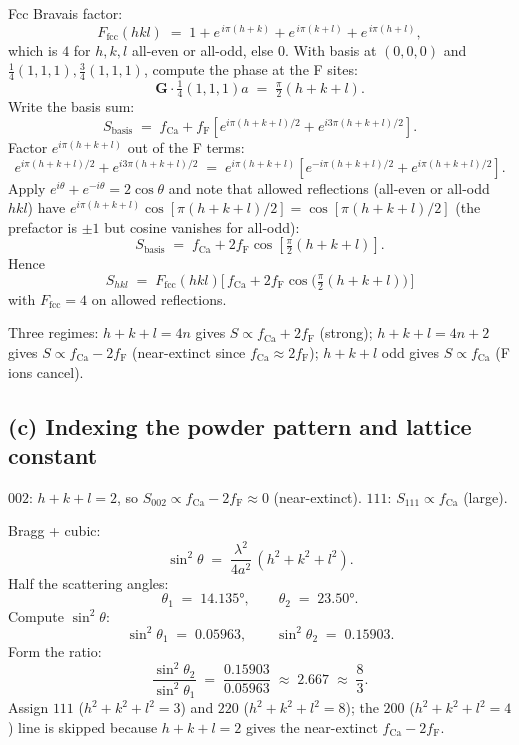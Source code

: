 \documentclass[11pt]{article}
\begin{document}
Fcc Bravais factor:
\begin{equation}
F_{\text{fcc}}(hkl) \;=\; 1 + e^{\,i\pi(h+k)} + e^{\,i\pi(k+l)} + e^{\,i\pi(h+l)},
\label{eq:Ffcc}
\end{equation}
which is $4$ for $h,k,l$ all-even or all-odd, else $0$. With basis at $(0,0,0)$ and $\tfrac14(1,1,1),\tfrac34(1,1,1)$, compute the phase at the F sites:
\[
\mathbf{G}\cdot\tfrac14(1,1,1)a \;=\; \tfrac\pi 2(h+k+l).
\]
Write the basis sum:
\[
S_{\text{basis}} \;=\; f_{\text{Ca}} + f_{\text{F}}\!\left[e^{i\pi(h+k+l)/2}+e^{i3\pi(h+k+l)/2}\right].
\]
Factor $e^{i\pi(h+k+l)}$ out of the F terms:
\[
e^{i\pi(h+k+l)/2}+e^{i3\pi(h+k+l)/2} \;=\; e^{i\pi(h+k+l)}\left[e^{-i\pi(h+k+l)/2}+e^{i\pi(h+k+l)/2}\right].
\]
Apply $e^{i\theta}+e^{-i\theta}=2\cos\theta$ and note that allowed reflections (all-even or all-odd $hkl$) have $e^{i\pi(h+k+l)}\cos[\pi(h+k+l)/2] = \cos[\pi(h+k+l)/2]$ (the prefactor is $\pm1$ but cosine vanishes for all-odd):
\[
S_{\text{basis}} \;=\; f_{\text{Ca}} + 2f_{\text{F}}\cos\!\left[\tfrac\pi 2(h+k+l)\right].
\]
Hence
\begin{equation}
\boxed{\;S_{hkl} \;=\; F_{\text{fcc}}(hkl)\Big[\, f_{\text{Ca}} + 2 f_{\text{F}}\cos\!\big(\tfrac{\pi}{2}(h+k+l)\big)\,\Big]\;}
\label{eq:Scaf2}
\end{equation}
with $F_{\text{fcc}}=4$ on allowed reflections.

Three regimes: $h+k+l=4n$ gives $S\propto f_{\text{Ca}}+2f_{\text{F}}$ (strong); $h+k+l=4n+2$ gives $S\propto f_{\text{Ca}}-2f_{\text{F}}$ (near-extinct since $f_{\text{Ca}}\approx 2f_{\text{F}}$); $h+k+l$ odd gives $S\propto f_{\text{Ca}}$ (F ions cancel).

\subsection*{(c) Indexing the powder pattern and lattice constant}

$002$: $h+k+l=2$, so $S_{002}\propto f_{\text{Ca}}-2f_{\text{F}}\approx 0$ (near-extinct). $111$: $S_{111}\propto f_{\text{Ca}}$ (large).

Bragg + cubic:
\begin{equation}
\sin^2\theta \;=\; \frac{\lambda^2}{4 a^2}\,(h^2+k^2+l^2).
\label{eq:Bragg}
\end{equation}
Half the scattering angles:
\[
\theta_1 \;=\; \ang{14.135},\qquad \theta_2 \;=\; \ang{23.50}.
\]
Compute $\sin^2\theta$:
\[
\sin^2\theta_1 \;=\; 0.05963,\qquad \sin^2\theta_2 \;=\; 0.15903.
\]
Form the ratio:
\[
\frac{\sin^2\theta_2}{\sin^2\theta_1} \;=\; \frac{0.15903}{0.05963} \;\approx\; 2.667 \;\approx\; \frac{8}{3}.
\]
Assign $111$ ($h^2+k^2+l^2=3$) and $220$ ($h^2+k^2+l^2=8$); the $200$ ($h^2+k^2+l^2=4$) line is skipped because $h+k+l=2$ gives the near-extinct $f_{\text{Ca}}-2f_{\text{F}}$.
\end{document}

